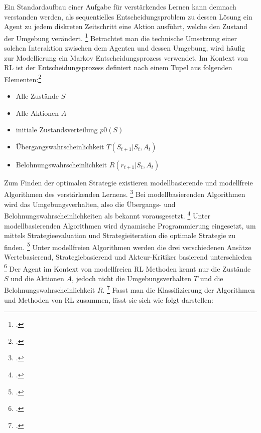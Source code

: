 Ein Standardaufbau einer Aufgabe für verstärkendes Lernen kann demnach verstanden werden, als sequentielles Entscheidungsproblem zu dessen Lösung ein Agent zu jedem diskreten Zeitschritt eine Aktion ausführt, welche den Zustand der Umgebung verändert. \footcite[Vgl.][S. 2]{Zhao.2020}
Betrachtet man die technische Umsetzung einer solchen Interaktion zwischen dem Agenten und dessen Umgebung, wird häufig zur Modellierung ein Markov Entscheidungsprozess verwendet.
Im Kontext von RL ist der Entscheidungsprozess definiert nach einem Tupel aus folgenden Elementen:\footcite[Vgl.][S. 2]{Zhang.2018}
\begin{itemize}
    \item Alle Zustände $S$
    \item Alle Aktionen $A$
    \item initiale Zustandsverteilung $p0(S)$
    \item Übergangswahrscheinlichkeit $T(S_{t+1}|S_{t},A_{t})$
    \item Belohnungswahrscheinlichkeit $R(r_{t+1}|S_{t},A_{t})$
\end{itemize}

Zum Finden der optimalen Strategie existieren modellbasierende und modellfreie Algorithmen des verstärkenden Lernens. \footcite[Vgl.][S. 3]{Wang.2020}
Bei modellbasierenden Algorithmen wird das Umgebungsverhalten, also die Übergangs- und Belohnungswahrscheinlichkeiten als bekannt vorausgesetzt. \footcite[Vgl.][S. 3]{Wang.2020}
Unter modellbasierenden Algorithmen wird dynamische Programmierung eingesetzt, um mittels Strategieevaluation und Strategieiteration die optimale Strategie zu finden. \footcite[Vgl.][S. 5]{Li.2019}
Unter modellfreien Algorithmen werden die drei verschiedenen Ansätze Wertebasierend, Strategiebasierend und Akteur-Kritiker basierend unterschieden \footcite[Vgl.][S. 5]{Li.2019}
Der Agent im Kontext von modellfreien RL Methoden kennt nur die Zustände $S$ und die Aktionen $A$, jedoch nicht die Umgebungsverhalten $T$ und die Belohnungswahrscheinlichkeit $R$. \footcite[Vgl.][S. 2]{Cutler.2014}
Fasst man die Klassifizierung der Algorithmen und Methoden von RL zusammen, lässt sie sich wie folgt darstellen:

